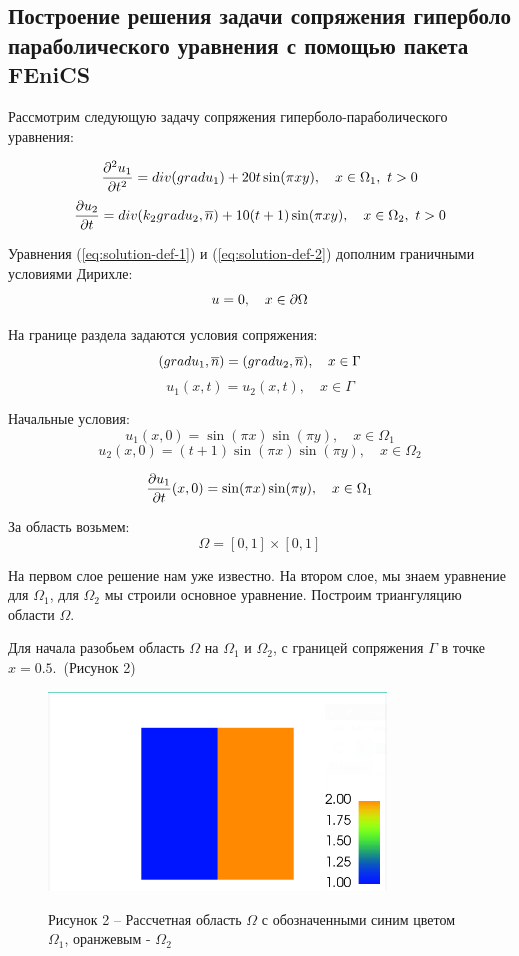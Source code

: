 \subsection{Построение решения задачи сопряжения гиперболо параболического уравнения с помощью пакета FEniCS}

Рассмотрим следующую задачу сопряжения гиперболо-параболического уравнения:

\begin{equation}
   {\frac{\partial^2 u_1}{\partial t^2}} = div(gradu_1) + 20t\sin(\pi xy), \quad x \in \Omega_1,~t > 0  
    \label{eq:solution-def-1}
\end{equation}
\begin{equation}
    {\frac{\partial u_2}{\partial t}} = div(k_2 grad u_2, \overline{n}) + 10(t+1)\sin(\pi xy),\quad x\in \Omega_2,~t > 0
    \label{eq:solution-def-2}
\end{equation}

Уравнения (\ref{eq:solution-def-1}) и (\ref{eq:solution-def-2}) дополним граничными условиями Дирихле:
$$ u = 0, \quad x \in {\partial \Omega} $$

На границе раздела задаются условия сопряжения:
$$(gradu_1, \overline{n}) = (gradu_2, \overline{n}), \quad x \in \Gamma  $$
$$ u_1(x,t) = u_2(x, t), \quad x \in \Gamma $$

Начальные условия:
$$ u_1(x, 0) = \sin(\pi x)\sin(\pi y), \quad x \in \Omega_1  $$
$$ u_2(x, 0) = (t+1)\sin(\pi x)\sin(\pi y), \quad x \in \Omega_2  $$

$$ {\frac{\partial u_1}{\partial t}}(x, 0) = \sin(\pi x)\sin(\pi y), \quad x \in \Omega_1 $$

За область возьмем:
$$ \Omega = [0,1]\times[0,1]$$


На первом слое решение нам уже известно. На втором слое, мы знаем уравнение для $\Omega_1$, для $\Omega_2$ мы строили основное уравнение. Построим триангуляцию области $\Omega$. 

Для начала разобьем область $\Omega$ на $\Omega_1$ и $\Omega_2$, с границей сопряжения $\Gamma$ в точке $x = 0.5$.~(Рисунок 2)

\begin{figure}[H]
      \centering
      \includegraphics[width=0.8\textwidth]{plots/domains.png}\\
      \centering\caption*{Рисунок 2 -- Рассчетная область $\Omega$ с обозначенными синим цветом $\Omega_1$, оранжевым - $\Omega_2$}
\end{figure}

